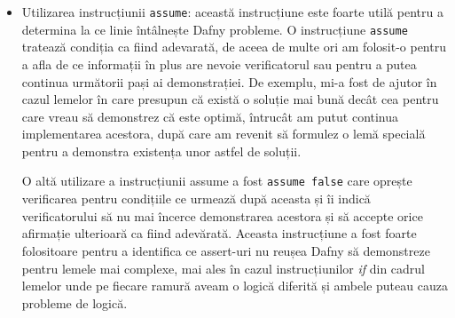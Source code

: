 \begin{sloppypar}
\begin{itemize}
\begin{Verbatim}[commandchars=\\\{\}]
\end{Verbatim}
    se asigură că după apelarea lemei computeGainAdd0 verificatorul știe că profitul unei soluții rămâne neschimbat dacă eliminăm ultimul element de 0 din soluție. \par
    \hspace{2mm} De asemenea, folosind structura \texttt{assert ... by} putem reduce sarcina verificatorului deoarece pașii din acest bloc de instrucțiuni sunt "uitați" după verificarea condiției din assert:
    \begin{Verbatim}[commandchars=\\\{\}]
\PY{k}{assert} \PY{n}{gain}\PY{p}{(}\PY{n}{p}\PY{p}{,} \PY{n}{x}\PY{p}{[}\PY{p}{..}\PY{n}{i} \PY{o}{\PYZhy{}} \PY{l+m+mi}{1}\PY{p}{]}\PY{p}{)} \PY{o}{==} \PY{n}{gain}\PY{p}{(}\PY{n}{p}\PY{p}{,} \PY{n}{solution1}\PY{p}{)} \PY{n}{by}
\PY{p}{\PYZob{}}
  \PY{n}{optimalSolRemove1}\PY{p}{(}\PY{n}{p}\PY{p}{,} \PY{n}{x}\PY{p}{,} \PY{n}{i}\PY{p}{,} \PY{n}{j}\PY{p}{)}\PY{p}{;}
  \PY{k}{assert} \PY{n}{isOptimalPartialSolution}\PY{p}{(}\PY{n}{p}\PY{p}{,} \PY{n}{x}\PY{p}{[}\PY{p}{..}\PY{n}{i} \PY{o}{\PYZhy{}} \PY{l+m+mi}{1}\PY{p}{]}\PY{p}{,} 
    \PY{n}{i} \PY{o}{\PYZhy{}} \PY{l+m+mi}{1}\PY{p}{,} \PY{n}{j} \PY{o}{\PYZhy{}} \PY{n}{p}\PY{p}{.}\PY{n}{weights}\PY{p}{[}\PY{n}{i} \PY{o}{\PYZhy{}} \PY{l+m+mi}{1}\PY{p}{]}\PY{p}{)}\PY{p}{;}
\PY{p}{\PYZcb{}} 
\end{Verbatim}
    \item Utilizarea instrucțiunii \texttt{assume}: această instrucțiune este foarte utilă pentru a determina la ce linie întâlnește Dafny probleme. O instrucțiune \texttt{assume} tratează condiția ca fiind adevarată, de aceea de multe ori am folosit-o pentru a afla de ce informații în plus are nevoie verificatorul sau pentru a putea continua următorii pași ai demonstrației. De exemplu, mi-a fost de ajutor în cazul lemelor în care presupun că există o soluție mai bună decât cea pentru care vreau să demonstrez că este optimă, întrucât am putut continua implementarea acestora, după care am revenit să formulez o lemă specială pentru a demonstra existența unor astfel de soluții. \par
    \hspace{2mm} O altă utilizare a instrucțiunii assume a fost \texttt{assume false} care oprește verificarea pentru condițiile ce urmează după aceasta și îi indică verificatorului să nu mai încerce demonstrarea acestora și să accepte orice afirmație ulterioară ca fiind adevărată. Aceasta instrucțiune a fost foarte folositoare pentru a identifica ce assert-uri nu reușea Dafny să demonstreze pentru lemele mai complexe, mai ales în cazul instrucțiunilor \textit{if} din cadrul lemelor unde pe fiecare ramură aveam o logică diferită și ambele puteau cauza probleme de logică.

\end{itemize}
\end{sloppypar}
